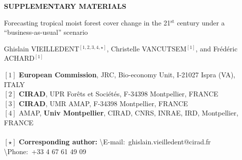 \renewcommand{\bibsection}{}  %

\begin{center}
  \Large{\textbf{SUPPLEMENTARY MATERIALS}}
\end{center}

\vspace{1cm}

\begin{center}
  \LARGE{Forecasting tropical moist forest cover change in the 21$^{\text{st}}$ century under a ``business-as-usual'' scenario}
\end{center}

\vspace{1cm}

\begin{center}
  \large{Ghislain VIEILLEDENT$^{[1, 2, 3, 4, \star]}$, Christelle VANCUTSEM$^{[1]}$, and Frédéric ACHARD$^{[1]}$}
\end{center}

\vspace{1cm}

{\small
  \begin{flushleft}  
    $[1]$ \textbf{European Commission}, JRC, Bio-economy Unit, I-21027 Ispra (VA), ITALY\\
    $[2]$ \textbf{CIRAD}, UPR Forêts et Sociétés, F-34398 Montpellier, FRANCE\\
    $[3]$ \textbf{CIRAD}, UMR AMAP, F-34398 Montpellier, FRANCE\\
    $[4]$ AMAP, \textbf{Univ Montpellier}, CIRAD, CNRS, INRAE, IRD, Montpellier, FRANCE\\
    ~\\
    $[\star]$ \textbf{Corresponding author:}
    \textbackslash{E-mail}:~ghislain.vieilledent@cirad.fr
    \textbackslash{Phone}:~+33 4 67 61 49 09\\
  \end{flushleft}}

\newpage
